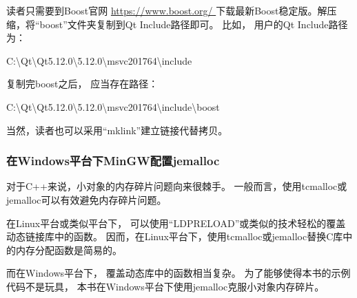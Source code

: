读者只需要到Boost官网 \url{https://www.boost.org/
}下载最新Boost稳定版。解压缩，将“boost”文件夹复制到Qt Include路径即可。
比如，
用户的Qt Include路径为：
\begin{littlelongworld}
C:\textbackslash{}Qt\textbackslash{}Qt5.12.0\textbackslash{}5.12.0\textbackslash{}msvc2017\underline{\hspace{0.5em}}64\textbackslash{}include
\end{littlelongworld}
复制完boost之后，
应当存在路径：
\begin{littlelongworld}
C:\textbackslash{}Qt\textbackslash{}Qt5.12.0\textbackslash{}5.12.0\textbackslash{}msvc2017\underline{\hspace{0.5em}}64\textbackslash{}include\textbackslash{}boost
\end{littlelongworld}
\hspace*{\parindent}当然，读者也可以采用“mklink”建立链接代替拷贝。

\FloatBarrier
\subsubsection{
在Windows平台下MinGW配置jemalloc
}\label{ss000310}


对于C{\sourcefonttwo{}+}{\sourcefonttwo{}+}来说，小对象的内存碎片问题向来很棘手。
一般而言，使用tcmalloc或jemalloc可以有效避免内存碎片问题。

在Linux平台或类似平台下，
可以使用“LD\underline{\hspace{0.5em}}PRELOAD”或类似的技术轻松的覆盖动态链接库中的函数。
因而，在Linux平台下，使用tcmalloc或jemalloc替换C库中的内存分配函数是简易的。

而在Windows平台下，
覆盖动态库中的函数相当复杂。
为了能够使得本书的示例代码不是玩具，
本书在Windows平台下使用jemalloc克服小对象内存碎片。

